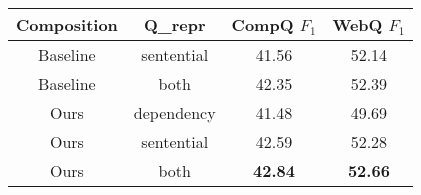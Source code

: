 %
%
%
%
%

\begin{table}[ht]
    \centering
    \begin{tabular} {c|c|c|c}
        \hline
        Composition     & Q\_repr   &   CompQ $F_1$   & WebQ $F_1$ \\
        \hline
        Baseline        &   sentential    &   41.56   & 52.14 \\
        Baseline        &   both          &   42.35   & 52.39 \\
        \hline
        Ours            &   dependency    &   41.48   & 49.69 \\
        Ours            &   sentential    &   42.59   & 52.28 \\
        Ours            &   both          &   \textbf{42.84}   & \textbf{52.66} \\
        \hline
    \end{tabular}
    \label{tab:compqa-abl-qw}
\end{table}




